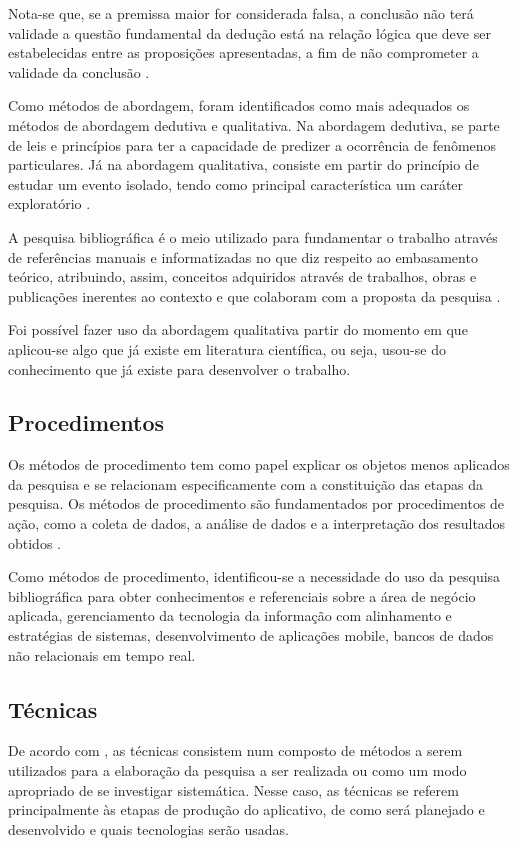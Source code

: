Nota-se que, se a premissa maior for considerada falsa, a conclusão não terá validade a questão fundamental da dedução está na relação lógica que deve ser estabelecidas entre as proposições apresentadas, a fim de não comprometer a validade da conclusão \citep{mezzaroba_monteiro_2014}.

Como métodos de abordagem, foram identificados como mais adequados os métodos de abordagem dedutiva e qualitativa. Na abordagem dedutiva, se parte de leis e princípios para ter a capacidade de predizer a ocorrência de fenômenos particulares. Já na abordagem qualitativa, consiste em partir do princípio de estudar  um evento isolado, tendo como principal característica um caráter exploratório \citep{lovato_2007}.

A pesquisa bibliográfica é o meio utilizado para fundamentar o trabalho através de referências manuais e informatizadas no que diz respeito ao embasamento teórico, atribuindo, assim, conceitos adquiridos através de trabalhos, obras e publicações inerentes ao contexto e que colaboram com a proposta da pesquisa \cite{lovato_2007}.

Foi possível fazer uso da abordagem qualitativa partir do momento em que aplicou-se algo que já existe em literatura científica, ou seja, usou-se do conhecimento que já existe para desenvolver o trabalho.

\subsection{Procedimentos}
Os métodos de procedimento tem como papel explicar os objetos menos aplicados da pesquisa e se relacionam especificamente com a constituição das etapas da pesquisa. Os métodos de procedimento são fundamentados por procedimentos de ação, como a coleta de dados, a análise de dados e a interpretação dos resultados obtidos \citep{lovato_2007}.

Como métodos de procedimento, identificou-se a necessidade do uso da pesquisa bibliográfica para obter conhecimentos e referenciais sobre a área de negócio aplicada, gerenciamento da tecnologia da informação com alinhamento e estratégias de sistemas, desenvolvimento de aplicações mobile, bancos de dados não relacionais em tempo real.

\subsection{Técnicas}
De acordo com \cite{marconi_lakatos_2010}, as técnicas consistem num composto de métodos a serem utilizados para a elaboração da pesquisa a ser realizada ou como um modo apropriado de se investigar sistemática. Nesse caso, as técnicas se referem principalmente às etapas de produção do aplicativo, de como será planejado e desenvolvido e quais tecnologias serão usadas.

